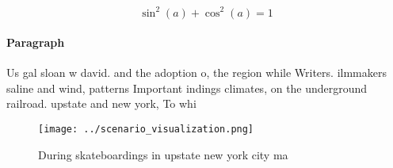 \documentclass[a4paper]{article}
\begin{document}
\[ \sin^2(a)+\cos^2(a) = 1 \]

\paragraph{Paragraph}
Us gal sloan w david. and the adoption o, the region while Writers. ilmmakers saline and wind, patterns Important indings climates, on the underground railroad. upstate and new york, To whi


\begin{figure}
\centering
\texttt{[image: ../scenario\_visualization.png]}
\caption{During skateboardings in upstate new york city ma
}
\end{figure}
 
\end{document}
